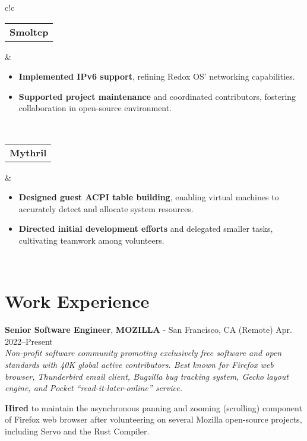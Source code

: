 \documentclass[a4paper,skipsamekey,11pt,english]{curve}
\newcommand{\makeWorkHistoryTitle}[5]{
  \begin{tcolorbox}[colback=base1!10,colframe=base1!10,frame hidden]
    {\color{blue}\textbf{#1}}, \textbf{#2} - #3 \hfill #4\\
    {\small\textit{#5}}
  \end{tcolorbox}
}
\begin{document}
\begin{center}
{\begin{tabular}{c!{\color{blue}\vrule}c}
      \hline
      {
       \begin{tabular}{c}
         \color{base03}\textbf{Smoltcp}
       \end{tabular}
      } & {
        \begin{minipage}{5in}
          \vspace{5pt}
          \begin{itemize}
            \item \textbf{Implemented IPv6 support}, refining Redox OS’
            networking capabilities.
            \item \textbf{Supported project maintenance} and coordinated
            contributors, fostering collaboration in open-source environment.
          \end{itemize}
        \end{minipage}
        \vspace{1pt}
      }
      \\
      \hline
      {
       \begin{tabular}{c}
         \color{base03}\textbf{Mythril}
       \end{tabular}
      } & {
        \begin{minipage}{5in}
          \vspace{5pt}
          \begin{itemize}
            \item \textbf{Designed guest ACPI table building}, enabling virtual
            machines to accurately detect and allocate system resources.
            \item \textbf{Directed initial development efforts} and delegated
            smaller tasks, cultivating teamwork among volunteers.
          \end{itemize}
        \end{minipage}
        \vspace{1pt}
      }
      \\
    \end{tabular}}
  \end{center}

  \section{Work Experience}
  \makeWorkHistoryTitle
    {Senior Software Engineer}
    {MOZILLA}
    {San Francisco, CA (Remote)}
    {Apr. 2022–Present}
    {
      Non-profit software community promoting exclusively free software and open
      standards with 40K global active contributors. Best known for Firefox web
      browser, Thunderbird email client, Bugzilla bug tracking system, Gecko
      layout engine, and Pocket “read-it-later-online” service.
    }
  \textbf{Hired} to maintain the asynchronous panning and zooming (scrolling)
  component of Firefox web browser after volunteering on several Mozilla
  open-source projects, including Servo and the Rust Compiler.
\end{document}
